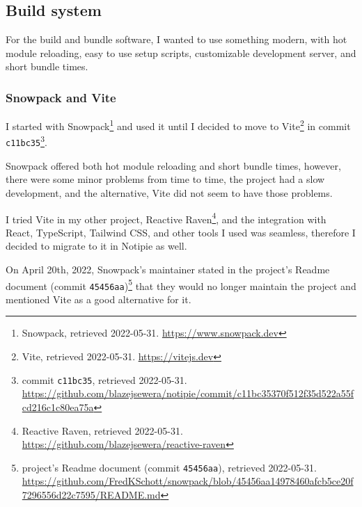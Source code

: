 \subsection{Build system}\label{build-system}

For the build and bundle software, I wanted to use something modern,
with hot module reloading, easy to use setup scripts, customizable
development server, and short bundle times.

\subsubsection{Snowpack and Vite}\label{snowpack-and-vite}

I started with Snowpack\footnote{Snowpack, retrieved 2022-05-31.
\url{https://www.snowpack.dev}} and used it until I decided to move to
Vite\footnote{Vite, retrieved 2022-05-31. \url{https://vitejs.dev}} in
commit \texttt{c11bc35}\footnote{commit \texttt{c11bc35}, retrieved
2022-05-31.
\url{https://github.com/blazejsewera/notipie/commit/c11bc35370f512f35d522a55fcd216c1c80ea75a}}.

Snowpack offered both hot module reloading and short bundle times,
however, there were some minor problems from time to time, the project
had a slow development, and the alternative, Vite did not seem to have
those problems.

I tried Vite in my other project, Reactive Raven\footnote{Reactive
Raven, retrieved 2022-05-31.
\url{https://github.com/blazejsewera/reactive-raven}}, and the
integration with React, TypeScript, Tailwind CSS, and other tools I used
was seamless, therefore I decided to migrate to it in Notipie as well.

On April 20th, 2022, Snowpack's maintainer stated in the project's
Readme document (commit \texttt{45456aa})\footnote{project's Readme
document (commit \texttt{45456aa}), retrieved 2022-05-31.
\url{https://github.com/FredKSchott/snowpack/blob/45456aa14978460afcb5ce20f7296556d22c7595/README.md}}
that they would no longer maintain the project and mentioned Vite as a
good alternative for it.

